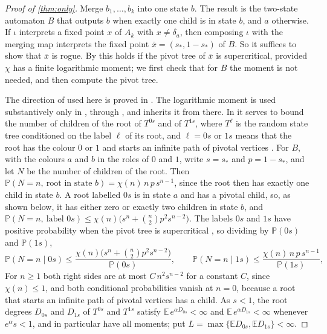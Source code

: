\documentclass[11pt]{amsart}
\theoremstyle{remark}
\begin{document}
\begin{proof}[Proof of \cref{thm:only}]
Merge $b_1,\dots,b_k$ into one state $b$. The result is the two-state automaton $B$ that outputs $b$ when exactly one child is in state $b$, and $a$ otherwise. If $\iota$ interprets a fixed point $x$ of $A_k$ with $x\ne\delta_a$, then composing $\iota$ with the merging map interprets the fixed point $\bar x=(s_*,1-s_*)$ of $B$. So it suffices to show that $\bar x$ is rogue. By \cite[Theorem~1.7]{JPS} this holds if the pivot tree of $\bar x$ is supercritical, provided $\chi$ has a finite logarithmic moment; we first check that for $B$ the moment is not needed, and then compute the pivot tree.

The direction of \cite[Theorem~1.7]{JPS} used here is proved in \cite[Section~4]{JPS}. The logarithmic moment is used substantively only in \cite[Lemma~4.14]{JPS}, through \cite[Lemma~4.13]{JPS}, and \cite[Lemma~4.15]{JPS} inherits it from there. In \cite[Lemma~4.14]{JPS} it serves to bound the number of children of the root of $T^{0s}$ and of $T^{1s}$, where $T^{\ell}$ is the random state tree conditioned on the label $\ell$ of its root, and $\ell=0s$ or $1s$ means that the root has the colour $0$ or $1$ and starts an infinite path of pivotal vertices \cite[Section~4]{JPS}. For $B$, with the colours $a$ and $b$ in the roles of $0$ and $1$, write $s=s_*$ and $p=1-s_*$, and let $N$ be the number of children of the root. Then $\mathbb P(N=n,\ \text{root in state }b)=\chi(n)\,n\,p\,s^{n-1}$, since the root then has exactly one child in state $b$. A root labelled $0s$ is in state $a$ and has a pivotal child, so, as shown below, it has either zero or exactly two children in state $b$, and $\mathbb P(N=n,\ \text{label }0s)\le\chi(n)\bigl(s^n+\binom n2p^2s^{n-2}\bigr)$. The labels $0s$ and $1s$ have positive probability when the pivot tree is supercritical \cite[Proposition~2.6(c)]{JPS}, so dividing by $\mathbb P(0s)$ and $\mathbb P(1s)$,
\[
\mathbb P(N=n\mid 0s)\le\frac{\chi(n)\bigl(s^n+\binom n2p^2s^{n-2}\bigr)}{\mathbb P(0s)},\qquad
\mathbb P(N=n\mid 1s)\le\frac{\chi(n)\,n\,p\,s^{n-1}}{\mathbb P(1s)},
\]
For $n\ge1$ both right sides are at most $C\,n^2s^{n-2}$ for a constant $C$, since $\chi(n)\le1$, and both conditional probabilities vanish at $n=0$, because a root that starts an infinite path of pivotal vertices has a child. As $s<1$, the root degrees $D_{0s}$ and $D_{1s}$ of $T^{0s}$ and $T^{1s}$ satisfy $\mathbb E\,e^{\alpha D_{0s}}<\infty$ and $\mathbb E\,e^{\alpha D_{1s}}<\infty$ whenever $e^\alpha s<1$, and in particular have all moments; put $L=\max\{\mathbb E D_{0s},\mathbb E D_{1s}\}<\infty$.


\end{proof}
\end{document}
